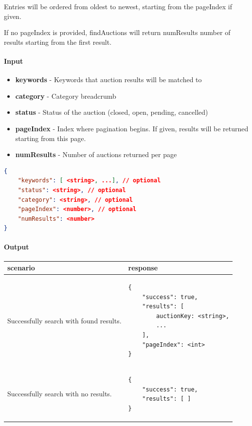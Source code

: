 \documentclass[12pt,a4paper]{article}
\begin{document}
Entries will be ordered from
oldest to newest, starting from the pageIndex if given. 

If no pageIndex is
provided, findAuctions will return numResults number of results starting from
the first result.

\paragraph{Input} 

\begin{itemize}
    \item \textbf{keywords} - Keywords that auction results will be matched to
    \item \textbf{category} - Category breadcrumb
    \item \textbf{status} - Status of the auction (closed, open, pending, cancelled)
    \item \textbf{pageIndex} - Index where pagination begins. If given, results will be returned starting from this page.
    \item \textbf{numResults} - Number of auctions returned per page
\end{itemize}

\begin{lstlisting}[language=json,numbers=none]
{
    "keywords": [ <string>, ...], // optional
    "status": <string>, // optional
    "category": <string>, // optional
    "pageIndex": <number>, // optional
    "numResults": <number>
}
\end{lstlisting}

\paragraph{Output}
\begin{center}
    \begin{tabular}{| p{7cm} | l |}
        \hline
        \textbf{scenario} & \textbf{response} \\
        \hline
        Successfully search with found results. &
        \begin{lstlisting}[language=tablejson,firstnumber=1]
{
    "success": true,
    "results": [ 
        auctionKey: <string>,
        ...
    ],
    "pageIndex": <int>
}
        \end{lstlisting} \\ 
        \hline
 \hline
        Successfully search with no results. &
        \begin{lstlisting}[language=tablejson,firstnumber=1]
{
    "success": true,
    "results": [ ]
}
         \end{lstlisting} \\ 
         \hline
    \end{tabular}
\end{center}
\end{document}
